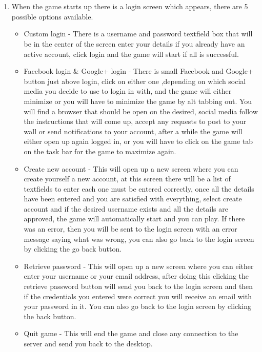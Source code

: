 \documentclass[letterpaper]{article}
\begin{document}
		\section*{\colorbox{black}{}} 
	\vspace{0.1in}
	\begin{enumerate}
	\item When the game starts up there is a login screen which appears, there are 5 possible options available.
		\begin{itemize}
			
			\item Custom login - There is a username and password textfield box that will be in the center of the screen enter your details if you already have an active account, click login and the game will start if all is successful.\\
			\item Facebook login \& Google+ login - There is small Facebook and Google+ button just above login, click on either one ,depending on which social media you decide to use to login in with, and the game will either minimize or you will have to minimize the game by alt tabbing out. You will find a browser that should be open on the desired, social media follow the instructions that will come up, accept any requests to post to your wall or send notifications to your account, after a while the game will either open up again logged in, or you will have to click on the game tab on the task bar for the game to maximize again. \\
			\item Create new account - This will open up a new screen where you can create yourself a new account, at this screen there will be a list of textfields to enter each one must be entered correctly, once all the details have been entered and you are satisfied with everything, select create account and if the desired username exists and all the details are approved, the game will automatically start and you can play. If there was an error, then you will be sent to the login screen with an error message saying what was wrong, you can also go back to the login screen by clicking the go back button. \\
			\item Retrieve password - This will open up a new screen where you can either enter your username or your email address, after doing this clicking the retrieve password button will send you back to the login screen and then if the credentials you entered were correct you will receive an email with your password in it. You can also go back to the login screen by clicking the back button. \\
			\item Quit game - This will end the game and close any connection to the server and send you back to the desktop. \\
		

\end{itemize}
\end{enumerate}
\end{document}
